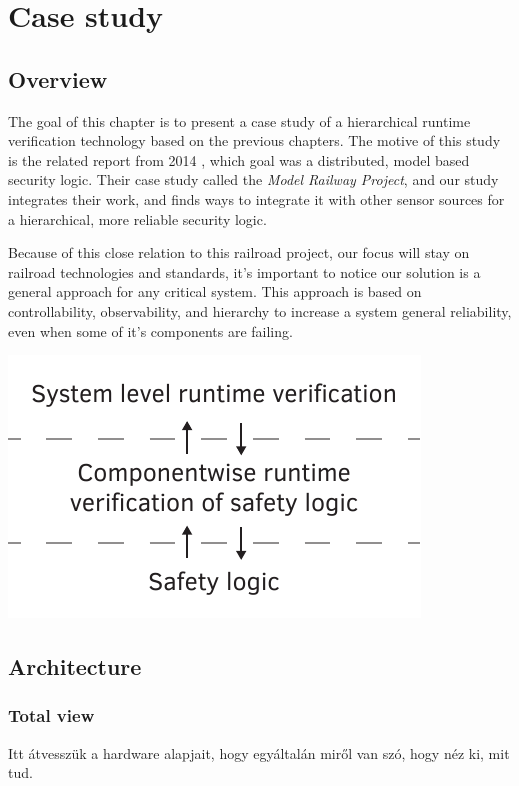 \chapter{Case study}
\label{chap:case_study}

\section{Overview}

The goal of this chapter is to present a case study of a hierarchical runtime verification technology based on the previous chapters. The motive of this study is the related report from 2014 \citep{tdk2014}, which goal was a distributed, model based security logic. Their case study called the \emph{Model Railway Project}, and our study integrates their work, and finds ways to integrate it with other sensor sources for a hierarchical, more reliable security logic.

Because of this close relation to this railroad project, our focus will stay on railroad technologies and standards, it's important to notice our solution is a general approach for any critical system. This approach is based on controllability, observability, and hierarchy to increase a system general reliability, even when some of it's components are failing.

\begin{minipage}{\textwidth}
	\centering
	\includegraphics[width=0.75\linewidth]{include/figures/chapter_6/overview_1}
\end{minipage}

\section{Architecture}
	\subsection{Total view}
	Itt átvesszük a hardware alapjait, hogy egyáltalán miről van szó, hogy néz ki, mit tud.
